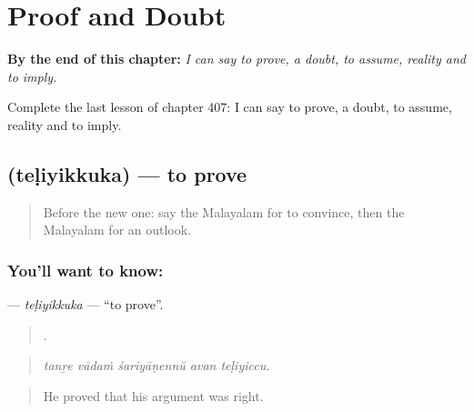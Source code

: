 
\chapter{Proof and Doubt}
\label{ch:ml-proof-and-doubt}

\begin{chapteropening}
\textbf{By the end of this chapter:} \emph{I can say to prove, a doubt, to assume, reality and to imply.}

Complete the last lesson of chapter 407: I can say to prove, a doubt, to assume, reality and to imply.
\end{chapteropening}

\section[\texorpdfstring{\ml{തെളിയിക്കുക} (teḷiyikkuka)}{തെളിയിക്കുക (teḷiyikkuka)}]{ (teḷiyikkuka) — to prove}

\label{lesson:ML-C407-teliyikkuka}



\begin{quote}
Before the new one: say the Malayalam for to convince, then the Malayalam for an outlook.
\end{quote}

\subsection*{You'll want to know: }
\textbf{} — \emph{teḷiyikkuka} — \textquotedblleft{}to prove\textquotedblright{}.

\begin{quote}
    .
\end{quote}

\begin{quote}
\emph{tanṟe vādaṁ śariyāṇennŭ avan teḷiyiccu.}
\end{quote}

\begin{quote}
He proved that his argument was right.
\end{quote}

